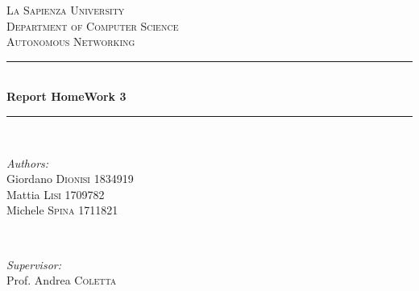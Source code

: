 \documentclass[12pt]{article}
\begin{document}
\begin{titlepage}

\newcommand{\HRule}{\rule{\linewidth}{0.5mm}} %

\center %
 

\textsc{\LARGE La Sapienza University}\\[1.5cm] %
\textsc{\Large Department of Computer Science}\\[0.5cm] %
\textsc{\large Autonomous Networking}\\[0.5cm] %


\HRule \\[0.4cm]
{ \huge \bfseries Report HomeWork 3}\\[0.4cm] %
\HRule \\[1.5cm]
 

\begin{minipage}{0.4\textwidth}
\begin{flushleft} \large
\emph{Authors:}\\
Giordano \textsc{Dionisi} 1834919 \\
Mattia \textsc{Lisi} 1709782 \\
Michele \textsc{Spina} 1711821 \\

\end{flushleft}
\end{minipage}
~
\begin{minipage}{0.4\textwidth}
\begin{flushright} \large
\emph{Supervisor:} \\
Prof. Andrea \textsc{Coletta} %


\end{flushright}
\end{minipage}
\end{titlepage}
\end{document}
